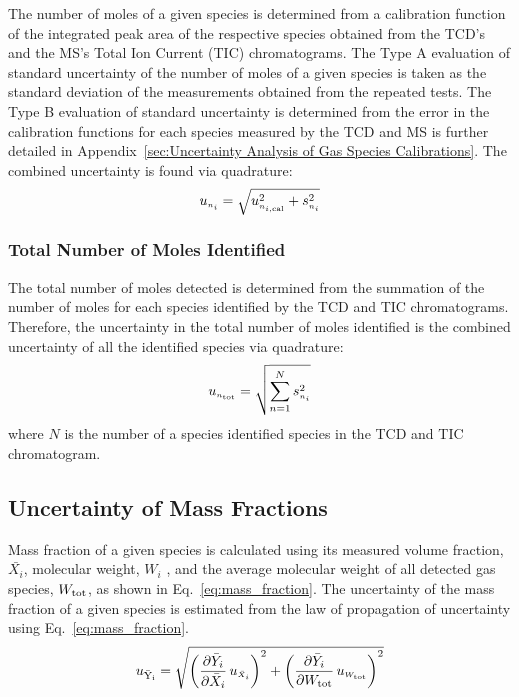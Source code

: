 \documentclass[12pt]{article}
\begin{document}
The number of moles of a given species is determined from a calibration function of the integrated peak area of the respective species obtained from the TCD's and the MS's Total Ion Current (TIC) chromatograms. The Type A evaluation of standard uncertainty of the number of moles of a given species is taken as the standard deviation of the measurements obtained from the repeated tests. The Type B evaluation of standard uncertainty is determined from the error in the calibration functions for each species measured by the TCD and MS is further detailed in Appendix~\ref{sec:Uncertainty Analysis of Gas Species Calibrations}. The combined uncertainty is found via quadrature:
\begin{equation}
\label{eq:gasspeciesuncertaintycertainty}
u_{\scriptscriptstyle n_{i}} = \sqrt{ u_{\scriptscriptstyle n_{i,\rm cal}}^2 + s_{\scriptscriptstyle n_{i}}^2}
\end{equation}

\subsubsection{Total Number of Moles Identified}
\label{ssec:Total Number of Moles Identified}
The total number of moles detected is determined from the summation of the number of moles for each species identified by the TCD and TIC chromatograms. Therefore, the uncertainty in the total number of moles identified is the combined uncertainty of all the identified species via quadrature:
\begin{equation}
\label{eq:totalnumberofmolesdetected}
u_{\scriptscriptstyle n_{\rm tot}}=\sqrt{{\sum_{n=1}^{N} s_{\scriptscriptstyle n_{i}}^2}}
\end{equation}
where $N$ is the number of a species identified species in the TCD and TIC chromatogram.

\subsection{Uncertainty of Mass Fractions}
\label{ssec:Uncertainty of Mass Fractions}

Mass fraction of a given species is calculated using its measured volume fraction, $\bar{X_{i}}$, molecular weight, $W_i$ , and the average molecular weight of all detected gas species, $W_{\rm tot}$, as shown in Eq.~\ref{eq:mass_fraction}. The uncertainty of the mass fraction of a given species is estimated from the law of propagation of uncertainty using Eq.~\ref{eq:mass_fraction}.
\begin{equation}\label{eq:Mass_Frac_Uncertainty}
u_\mathrm{\bar{Y}_{i}} = \sqrt{{\left( \frac{\partial \bar{Y}_{i}}{\partial \bar{X}_{i}}\,u_{\scriptscriptstyle \bar{X}_{i}} \right)}^2+{\left(\frac{\partial \bar{Y}_{i}}{\partial W_{\rm tot}}\,u_{\scriptscriptstyle W_{\rm{tot}}}\right)}^2}
\end{equation}
\end{document}
